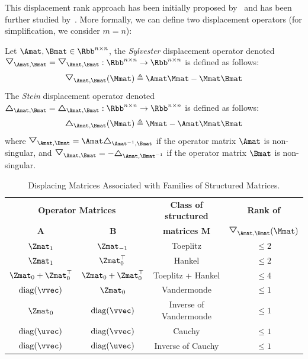 This displacement rank approach has been initially proposed by~\citet{kailath1979displacement} and has been further studied by~\citet{kailath1995displacement,pan2001structured}.
More formally, we can define two displacement operators (for simplification, we consider $m = n$):
\begin{definition}
  Let $\Amat, \Bmat \in \Rbb^{n \times n}$, the \emph{Sylvester} displacement operator denoted $\triangleopdown_{\Amat, \Bmat} = \triangleopdown_{\Amat, \Bmat}: \Rbb^{n \times n} \rightarrow \Rbb^{n \times n}$ is defined as follows:
  \begin{equation}
    \triangleopdown_{\Amat, \Bmat} (\Mmat) \triangleq \Amat \Mmat - \Mmat \Bmat
  \end{equation}
  The \emph{Stein} displacement operator denoted $\triangleopup_{\Amat, \Bmat} = \triangleopup_{\Amat, \Bmat}: \Rbb^{n \times n} \rightarrow \Rbb^{n \times n}$ is defined as follows:
  \begin{equation}
    \triangleopup_{\Amat, \Bmat} (\Mmat) \triangleq \Mmat - \Amat \Mmat \Bmat
  \end{equation}
  where $\triangleopdown_{\Amat, \Bmat} = \Amat \triangleopup_{\Amat^{-1}, \Bmat}$ if the operator matrix $\Amat$ is non-singular, and $\triangleopdown_{\Amat, \Bmat} = -\triangleopup_{\Amat, \Bmat^{-1}}$ if the operator matrix $\Bmat$ is non-singular.
\end{definition}



\begin{table}[t]
  \centering
  \begin{tabular}{c|c|c|c}
    \toprule
    \multicolumn{2}{c|}{\textbf{Operator Matrices}} & \textbf{Class of structured} & \textbf{Rank of } \\
    \textbf{A} & \textbf{B} & \textbf{matrices M} & $\triangleopdown_{\Amat, \Bmat}(\Mmat)$ \\
    \midrule
    $\Zmat_1$                & $\Zmat_{-1}$             & Toeplitz               & $\leq 2$ \\
    $\Zmat_1$                & $\Zmat_0^\top$           & Hankel                 & $\leq 2$ \\
    $\Zmat_0 + \Zmat_0^\top$ & $\Zmat_0 + \Zmat_0^\top$ & Toeplitz + Hankel      & $\leq 4$ \\
    $\diag(\vvec)$           & $\Zmat_0$                & Vandermonde            & $\leq 1$ \\
    $\Zmat_0$                & $\diag(\vvec)$           & Inverse of Vandermonde & $\leq 1$ \\
    $\diag(\uvec)$           & $\diag(\vvec)$           & Cauchy                 & $\leq 1$ \\
    $\diag(\vvec)$           & $\diag(\uvec)$           & Inverse of Cauchy      & $\leq 1$ \\
    \bottomrule
  \end{tabular}
  \caption{Displacing Matrices Associated with Families of Structured Matrices.}
  \label{table:ch2-displacing_matrices}
\end{table}



